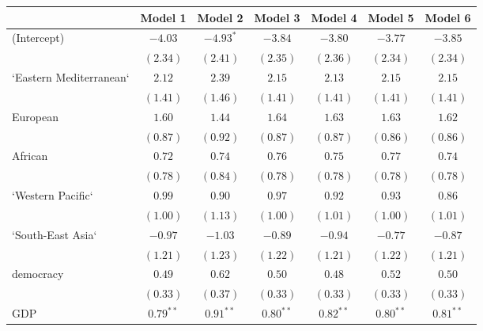 
\begin{table}[!h]
\begin{center}
\begin{tabular}{l c c c c c c }
\toprule
 & Model 1 & Model 2 & Model 3 & Model 4 & Model 5 & Model 6 \\
\midrule
(Intercept)             & $-4.03$      & $-4.93^{*}$  & $-3.84$      & $-3.80$      & $-3.77$      & $-3.85$      \\
                        & $(2.34)$     & $(2.41)$     & $(2.35)$     & $(2.36)$     & $(2.34)$     & $(2.34)$     \\
`Eastern Mediterranean` & $2.12$       & $2.39$       & $2.15$       & $2.13$       & $2.15$       & $2.15$       \\
                        & $(1.41)$     & $(1.46)$     & $(1.41)$     & $(1.41)$     & $(1.41)$     & $(1.41)$     \\
European                & $1.60$       & $1.44$       & $1.64$       & $1.63$       & $1.63$       & $1.62$       \\
                        & $(0.87)$     & $(0.92)$     & $(0.87)$     & $(0.87)$     & $(0.86)$     & $(0.86)$     \\
African                 & $0.72$       & $0.74$       & $0.76$       & $0.75$       & $0.77$       & $0.74$       \\
                        & $(0.78)$     & $(0.84)$     & $(0.78)$     & $(0.78)$     & $(0.78)$     & $(0.78)$     \\
`Western Pacific`       & $0.99$       & $0.90$       & $0.97$       & $0.92$       & $0.93$       & $0.86$       \\
                        & $(1.00)$     & $(1.13)$     & $(1.00)$     & $(1.01)$     & $(1.00)$     & $(1.01)$     \\
`South-East Asia`       & $-0.97$      & $-1.03$      & $-0.89$      & $-0.94$      & $-0.77$      & $-0.87$      \\
                        & $(1.21)$     & $(1.23)$     & $(1.22)$     & $(1.21)$     & $(1.22)$     & $(1.21)$     \\
democracy               & $0.49$       & $0.62$       & $0.50$       & $0.48$       & $0.52$       & $0.50$       \\
                        & $(0.33)$     & $(0.37)$     & $(0.33)$     & $(0.33)$     & $(0.33)$     & $(0.33)$     \\
GDP                     & $0.79^{**}$  & $0.91^{**}$  & $0.80^{**}$  & $0.82^{**}$  & $0.80^{**}$  & $0.81^{**}$  \\

\end{tabular}
\end{center}
\end{table}
